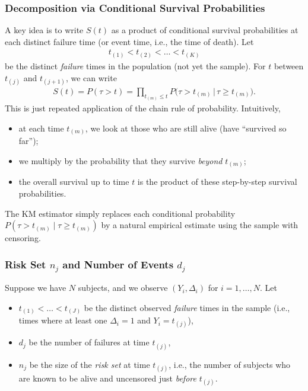 \documentclass{article}
\theoremstyle{plain}
\theoremstyle{definition}
\theoremstyle{remark}
\begin{document}
\subsubsection{Decomposition via Conditional Survival Probabilities}
A key idea is to write $S(t)$ as a product of conditional survival probabilities at each distinct failure time (or event time, i.e., the time of death). 
Let
\begin{align}
    t_{(1)} < t_{(2)} < \dots < t_{(K)}
\end{align}
be the distinct \emph{failure} times in the population (not yet the sample). For $t$ between $t_{(j)}$ and $t_{(j+1)}$, we can write
\begin{align}
    S(t) 
    = P(\tau>t)
    = \prod_{t_{(m)} \le t} P\bigl(\tau > t_{(m)} \,\big|\, \tau \ge t_{(m)}\bigr).
\end{align}
This is just repeated application of the chain rule of probability. Intuitively,
\begin{itemize}
    \item at each time $t_{(m)}$, we look at those who are still alive (have ``survived so far'');
    \item we multiply by the probability that they survive \emph{beyond} $t_{(m)}$;
    \item the overall survival up to time $t$ is the product of these step-by-step survival probabilities.
\end{itemize}

The KM estimator simply replaces each conditional probability 
$P(\tau>t_{(m)} \mid \tau\ge t_{(m)})$
by a natural empirical estimate using the sample with censoring.

\subsubsection{Risk Set $n_j$ and Number of Events $d_j$}
Suppose we have $N$ subjects, and we observe $(Y_i,\Delta_i)$ for $i=1,\dots,N$. Let
\begin{itemize}
\item $t_{(1)} < \dots < t_{(J)}$ be the distinct observed \emph{failure} times in the sample (i.e., times where at least one $\Delta_i=1$ and $Y_i = t_{(j)}$),
\item $d_j$ be the number of failures at time $t_{(j)}$,
\item $n_j$ be the size of the \emph{risk set} at time $t_{(j)}$, i.e., the number of subjects who are known to be alive and uncensored just \emph{before} $t_{(j)}$.
\end{itemize}
\end{document}
